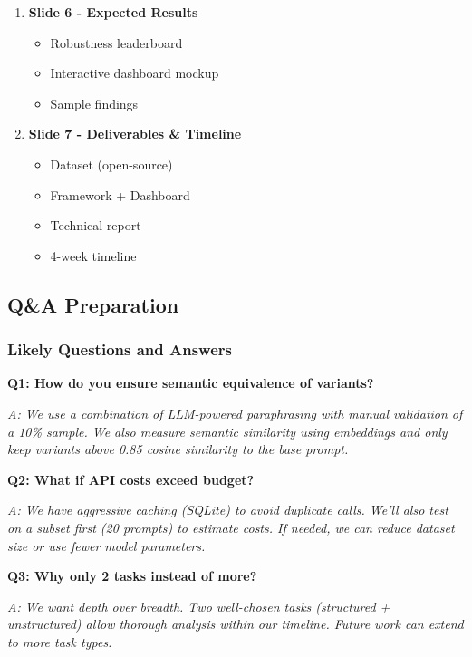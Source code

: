 \documentclass[11pt,a4paper]{article}
\begin{document}
\begin{enumerate}[leftmargin=*]
    \item \textbf{Slide 6 - Expected Results}
    \begin{itemize}
        \item Robustness leaderboard
        \item Interactive dashboard mockup
        \item Sample findings
    \end{itemize}
    
    \item \textbf{Slide 7 - Deliverables \& Timeline}
    \begin{itemize}
        \item Dataset (open-source)
        \item Framework + Dashboard
        \item Technical report
        \item 4-week timeline
    \end{itemize}
\end{enumerate}

\subsection{Q\&A Preparation}

\subsubsection{Likely Questions and Answers}

\textbf{Q1: How do you ensure semantic equivalence of variants?}

\textit{A: We use a combination of LLM-powered paraphrasing with manual validation of a 10\% sample. We also measure semantic similarity using embeddings and only keep variants above 0.85 cosine similarity to the base prompt.}

\vspace{0.3cm}

\textbf{Q2: What if API costs exceed budget?}

\textit{A: We have aggressive caching (SQLite) to avoid duplicate calls. We'll also test on a subset first (20 prompts) to estimate costs. If needed, we can reduce dataset size or use fewer model parameters.}

\vspace{0.3cm}

\textbf{Q3: Why only 2 tasks instead of more?}

\textit{A: We want depth over breadth. Two well-chosen tasks (structured + unstructured) allow thorough analysis within our timeline. Future work can extend to more task types.}
\end{document}
